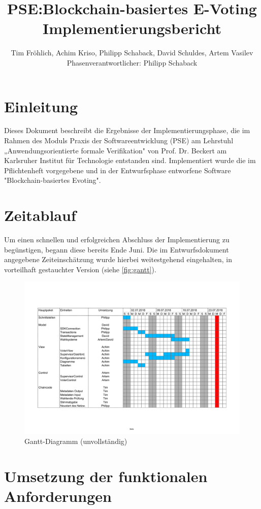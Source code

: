 \documentclass[parskip=full]{scrartcl}
\title{
	PSE:Blockchain-basiertes E-Voting \\
	Implementierungsbericht
}
\author{Tim Fröhlich, Achim Kriso, Philipp Schaback, David Schuldes, Artem Vasilev\\ Phasenverantwortlicher: Philipp Schaback}
\begin{document}
\clearpage
\maketitle
{}
\newpage

\tableofcontents
\newpage
{}

\section{Einleitung}
Dieses Dokument beschreibt die Ergebnisse der Implementierungsphase, die
im Rahmen des Moduls Praxis der Softwareentwicklung (PSE) am Lehrstuhl „Anwendungsorientierte formale Verifikation" von Prof. Dr. Beckert am Karlsruher Institut für
Technologie entstanden sind.
Implementiert wurde die im Pflichtenheft vorgegebene und in der Entwurfsphase entworfene Software "Blockchain-basiertes Evoting".


\section{Zeitablauf}
Um einen schnellen und erfolgreichen Abschluss der Implementierung zu begünstigen, begann diese bereits Ende Juni.
Die im Entwurfsdokument angegebene Zeiteinschätzung wurde hierbei weitestgehend eingehalten, in vorteilhaft gestauchter Version (siehe \autoref{fig:gantt}).
\begin{figure}[h!]
	\centering\includegraphics[width=\textwidth]{pictures/Gantt.pdf}
	\caption{Gantt-Diagramm (unvollständig)}
	\label{fig:gantt}
\end{figure}


\section{Umsetzung der funktionalen Anforderungen}
\end{document}
